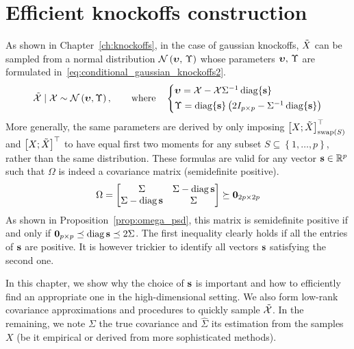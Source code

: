 \chapter{Efficient knockoffs construction}\label{ch:sdp}

As shown in Chapter~\ref{ch:knockoffs}, in the case of gaussian knockoffs,
$\tilde{X}$ can be sampled from a normal distribution $\mathcal{N}\left( \bm{\upsilon},\, \Upsilon \right)$ whose parameters
$\bm{\upsilon},\, \Upsilon$ are formulated in~\ref{eq:conditional_gaussian_knockoffs2}.
\begin{equation}\label{eq:conditional_gaussian_knockoffs2}
    \tcX \mid \cX \sim \cN\left( \bupsilon, \Upsilon \right)
    ,\qquad\text{where}\quad
    \begin{cases*}
        \bupsilon = \cX - \cX\Sigma^{-1}\diag\{ \bs \}\\
        \Upsilon = \diag\{ \bs \}\left( 2I_{p \times p} - \Sigma^{-1}\diag\{ \bs \} \right)
    \end{cases*}
\end{equation}
More generally, the same parameters are derived by only imposing
$\big[ X; \tilde{X} \big]_{\operatorname{swap}\left( S \right)}^\top$ and $\big[ X; \tilde{X} \big]^\top$
to have equal first two moments
for any subset
$S \subseteq \left\{ 1, \dots, p \right\}$,
rather than the same distribution.
These formulas are valid for any vector $\mathbf{s} \in \mathbb{R}^p$ such that $\Omega$
is indeed a covariance matrix (semidefinite positive).
\begin{equation*}
    \Omega = \begin{bmatrix}
        \Sigma & \Sigma - \operatorname*{diag} \mathbf{s}\\
        \Sigma - \operatorname*{diag} \mathbf{s} & \Sigma
    \end{bmatrix}
    \succeq \mathbf{0}_{2p \times 2p}
\end{equation*}
As shown in Proposition~\ref{prop:omega_psd},
this matrix is semidefinite positive if and only if $\mathbf{0}_{p \times p} \preceq \operatorname*{diag} \mathbf{s} \preceq 2 \Sigma$.
The first inequality clearly holds if all the entries of $\mathbf{s}$ are positive.
It is however trickier to identify all vectors $\mathbf{s}$ satisfying the second one.

In this chapter, we show why the choice of $\mathbf{s}$ is important and how to efficiently find an appropriate one
in the high-dimensional setting.
We also form low-rank covariance approximations and procedures to quickly sample $\tilde{\mathcal{X}}$.
In the remaining, we note $\Sigma$ the true covariance and $\hat{\Sigma}$ its estimation from the samples $X$
(be it empirical or derived from more sophisticated methods).

